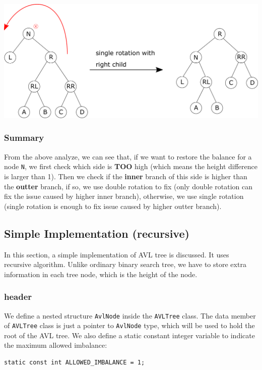 \documentclass[11pt]{book}
\begin{document}
\begin{center}
\includegraphics[width=400pt]{./img/AVL-deletion-RR-fix.pdf}
\end{center}
\subsubsection{Summary}
\label{sec:org98b547e}
From the above analyze, we can see that, if we want to restore the balance for a node \texttt{N}, we first check which side is \textbf{TOO} high (which means the height difference is larger than 1). Then we check if the \textbf{inner} branch of this side is higher than the \textbf{outter} branch, if so, we use double rotation to fix (only double rotation can fix the issue caused by higher inner branch), otherwise, we use single rotation (single rotation is enough to fix issue caused by higher outter branch).

\subsection{Simple Implementation (recursive)}
\label{sec:orgce988fb}
In this section, a simple implementation of AVL tree is discussed. It uses recursive algorithm. Unlike ordinary binary search tree, we have to store extra information in each tree node, which is the height of the node.

\subsubsection{header}
\label{sec:orge0d095f}
We define a nested structure \texttt{AvlNode} inside the \texttt{AVLTree} class. The data member of \texttt{AVLTree} class is just a pointer to \texttt{AvlNode} type, which will be used to hold the root of the AVL tree. We also define a static constant integer variable to indicate the maximum allowed imbalance:
\begin{verbatim}
static const int ALLOWED_IMBALANCE = 1;
\end{verbatim}
\end{document}
